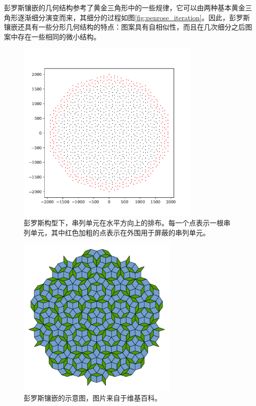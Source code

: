 彭罗斯镶嵌的几何结构参考了黄金三角形中的一些规律，它可以由两种基本黄金三角形逐渐细分演变而来，其细分的过程如图\ref{fig:penrose_iteration}。因此，彭罗斯镶嵌还具有一些分形几何结构的特点：图案具有自相似性，而且在几次细分之后图案中存在一些相同的微小结构。

\begin{figure}[!htb]%
    \centering
    \includegraphics[width=0.80\textwidth]{img/geo_layout_penrose.pdf}
    \caption{彭罗斯构型下，串列单元在水平方向上的排布。每一个点表示一根串列单元，其中红色加粗的点表示在外围用于屏蔽的串列单元。}
    \label{fig:geo_layout_penrose}
\end{figure}

\begin{figure}[!htb]%
    \centering
    \includegraphics[width=0.70\textwidth]{img/Penrose_tiling_wiki.pdf}
    \caption{彭罗斯镶嵌的示意图，图片来自于维基百科。}
    \label{fig:Penrose_tiling_wiki}
\end{figure}

